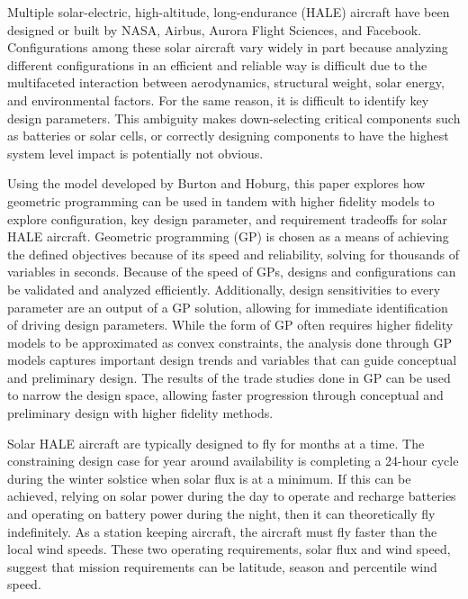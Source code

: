 \documentclass[]{aiaa-tc}%
\begin{document}
Multiple solar-electric, high-altitude, long-endurance (HALE) aircraft have been designed or built by NASA\cite{dunbar_2015}, Airbus\cite{zephyr}, Aurora Flight Sciences\cite{odysseus}, and Facebook\cite{aquila}.
Configurations among these solar aircraft vary widely in part because analyzing different configurations in an efficient and reliable way is difficult due to the multifaceted interaction between aerodynamics, structural weight, solar energy, and environmental factors.\cite{solartech}
For the same reason, it is difficult to identify key design parameters.  
This ambiguity makes down-selecting critical components such as batteries or solar cells, or correctly designing components to have the highest system level impact is potentially not obvious.  

Using the model developed by Burton and Hoburg\cite{burton_solar_2017}, this paper explores how geometric programming can be used in tandem with higher fidelity models to explore configuration, key design parameter, and requirement tradeoffs for solar HALE aircraft.
Geometric programming (GP) is chosen as a means of achieving the defined objectives because of its speed and reliability, solving for thousands of variables in seconds.\cite{gp}
Because of the speed of GPs, designs and configurations can be validated and analyzed efficiently.  
Additionally, design sensitivities to every parameter are an output of a GP solution, allowing for immediate identification of driving design parameters. 
While the form of GP often requires higher fidelity models to be approximated as convex constraints\cite{gpkit}, the analysis done through GP models captures important design trends and variables that can guide conceptual and preliminary design. 
The results of the trade studies done in GP can be used to narrow the design space, allowing faster progression through conceptual and preliminary design with higher fidelity methods. 
 
Solar HALE aircraft are typically designed to fly for months at a time.\cite{aquila}  
The constraining design case for year around availability is completing a 24-hour cycle during the winter solstice when solar flux is at a minimum.  
If this can be achieved, relying on solar power during the day to operate and recharge batteries and operating on battery power during the night, then it can theoretically fly indefinitely.  
As a station keeping aircraft, the aircraft must fly faster than the local wind speeds.  
These two operating requirements, solar flux and wind speed, suggest that mission requirements can be latitude, season and percentile wind speed. 
\end{document}
